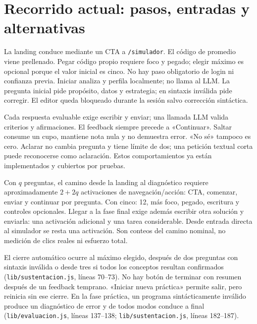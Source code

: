 \documentclass[11pt,a4paper]{report}
\newcommand{\src}[2]{\nolinkurl{#1}, líneas #2}
\begin{document}
\section{Recorrido actual: pasos, entradas y alternativas}
\begin{center}
\end{center}
La landing conduce mediante un CTA a \texttt{/simulador}. El código de promedio viene prellenado. Pegar código propio requiere foco y pegado; elegir máximo es opcional porque el valor inicial es cinco. No hay paso obligatorio de login ni confianza previa. Iniciar analiza y perfila localmente; no llama al LLM. La pregunta inicial pide propósito, datos y estrategia; en sintaxis inválida pide corregir. El editor queda bloqueado durante la sesión salvo corrección sintáctica.

Cada respuesta evaluable exige escribir y enviar; una llamada LLM valida criterios y afirmaciones. El feedback siempre precede a «Continuar». Saltar consume un cupo, mantiene nota nula y no demuestra error. «No sé» tampoco es cero. Aclarar no cambia pregunta y tiene límite de dos; una petición textual corta puede reconocerse como aclaración. Estos comportamientos ya están implementados y cubiertos por pruebas.

Con \(q\) preguntas, el camino desde la landing al diagnóstico requiere aproximadamente \(2+2q\) activaciones de navegación/acción: CTA, comenzar, enviar y continuar por pregunta. Con cinco: 12, más foco, pegado, escritura y controles opcionales. Llegar a la fase final exige además escribir otra solución y enviarla: una activación adicional y una tarea considerable. Desde entrada directa al simulador se resta una activación. Son conteos del camino nominal, no medición de clics reales ni esfuerzo total.

El cierre automático ocurre al máximo elegido, después de dos preguntas con sintaxis inválida o desde tres si todos los conceptos resultan confirmados (\src{lib/sustentacion.js}{70--73}). No hay botón de terminar con resumen después de un feedback temprano. «Iniciar nueva práctica» permite salir, pero reinicia sin ese cierre. En la fase práctica, un programa sintácticamente inválido produce un diagnóstico de error y de todos modos conduce a final (\src{lib/evaluacion.js}{137--138}; \src{lib/sustentacion.js}{182--187}).
\end{document}

